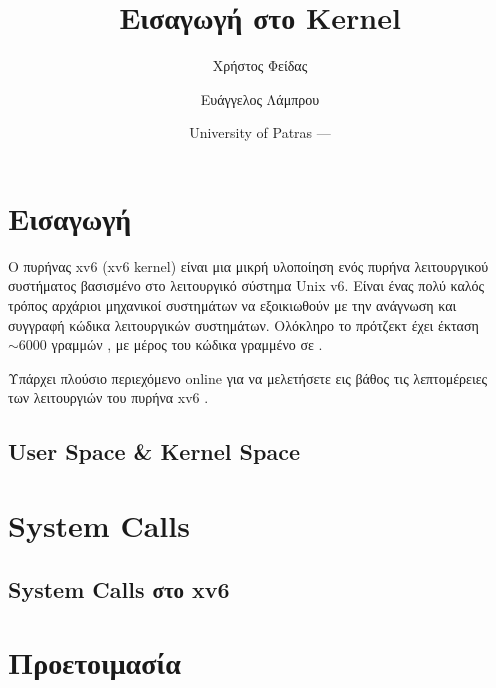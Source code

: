 \documentclass[18pt]{extarticle}
\title{Εισαγωγή στο \src{xv6} Kernel} %
\author{\footnotesize Χρήστος Φείδας\\ \footnotesize \src{fidas@upatras.gr} \and \footnotesize Ευάγγελος Λάμπρου\\ \footnotesize \src{e.lamprou@upnet.gr}} %
\date{University of Patras --- \the\year{}} %
\begin{document}
\pagestyle{fancy}
\fancyhf{} %
\renewcommand{\headrulewidth}{0pt}
\fancyhead{} %
\fancyfoot{} %
\fancyfoot[R]{\thepage}

\maketitle

\tableofcontents


\section{Εισαγωγή}

Ο πυρήνας xv6 (xv6 kernel) \cite{xv6Kernel} είναι μια μικρή υλοποίηση ενός πυρήνα λειτουργικού 
συστήματος βασισμένο στο λειτουργικό σύστημα Unix v6.
Είναι ένας πολύ καλός τρόπος αρχάριοι μηχανικοί συστημάτων να εξοικιωθούν με την ανάγνωση και συγγραφή 
κώδικα λειτουργικών συστημάτων. Ολόκληρο το πρότζεκτ έχει έκταση $\sim 6000$ γραμμών 
, με μέρος του κώδικα γραμμένο σε .

Υπάρχει πλούσιο περιεχόμενο online για να μελετήσετε εις βάθος τις λεπτομέρειες
των λειτουργιών του πυρήνα xv6 \cite{xv6VideoSeries, xv6Book}.

\subsection{User Space \& Kernel Space}

\section{System Calls}

\subsection{System Calls στο xv6}

\section{Προετοιμασία}
\end{document}
